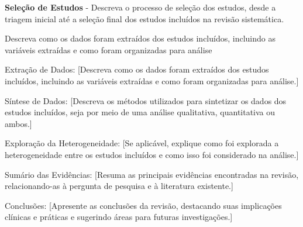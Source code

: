 		\par \textbf{Seleção de Estudos} - Descreva o processo de seleção dos estudos, desde a triagem inicial até a seleção final dos estudos incluídos na revisão sistemática.
		
		\par Descreva como os dados foram extraídos dos estudos incluídos, incluindo as variáveis ​​extraídas e como foram organizadas para análise
		
		\par Extração de Dados: [Descreva como os dados foram extraídos dos estudos incluídos, incluindo as variáveis ​​extraídas e como foram organizadas para análise.]
		
		\par Síntese de Dados: [Descreva os métodos utilizados para sintetizar os dados dos estudos incluídos, seja por meio de uma análise qualitativa, quantitativa ou ambos.]

		\par Exploração da Heterogeneidade:	[Se aplicável, explique como foi explorada a heterogeneidade entre os estudos incluídos e como isso foi considerado na análise.]
		
		\par  Sumário das Evidências: [Resuma as principais evidências encontradas na revisão, relacionando-as à pergunta de pesquisa e à literatura existente.]
		
		\par  Conclusões: [Apresente as conclusões da revisão, destacando suas implicações clínicas e práticas e sugerindo áreas para futuras investigações.]